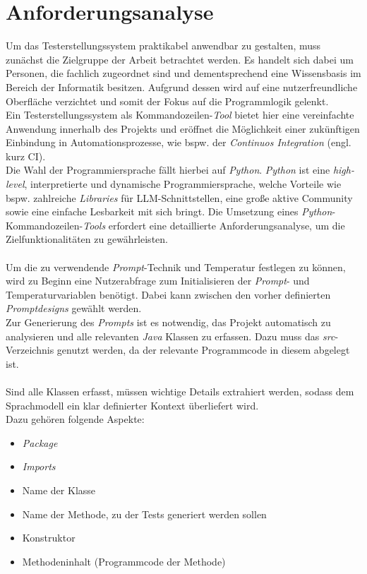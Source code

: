 \section{Anforderungsanalyse}\label{section:anford}
Um das Testerstellungssystem praktikabel anwendbar zu gestalten, muss zunächst die Zielgruppe der Arbeit betrachtet werden. Es handelt sich dabei um Personen, die fachlich zugeordnet sind und dementsprechend eine Wissensbasis im Bereich der Informatik besitzen. Aufgrund dessen wird auf eine nutzerfreundliche Oberfläche verzichtet und somit der Fokus auf die Programmlogik gelenkt.\\ Ein Testerstellungssystem als Kommandozeilen-\textit{Tool} bietet hier eine vereinfachte Anwendung innerhalb des Projekts und eröffnet die Möglichkeit einer zukünftigen Einbindung in Automationsprozesse, wie bspw. der \textit{Continuos Integration} (engl. kurz CI).\\ Die Wahl der Programmiersprache fällt hierbei auf \textit{Python}. \textit{Python} ist eine \textit{high-level}, interpretierte und dynamische Programmiersprache, welche Vorteile wie bspw. zahlreiche \textit{Libraries} für LLM-Schnittstellen, eine große aktive Community sowie eine einfache Lesbarkeit mit sich bringt. \cite*{PythonLanguageAdvantages2017} Die Umsetzung eines \textit{Python}-Kommandozeilen-\textit{Tools} erfordert eine detaillierte Anforderungsanalyse, um die Zielfunktionalitäten zu gewährleisten.\\\\
Um die zu verwendende \textit{Prompt}-Technik und Temperatur festlegen zu können, wird zu Beginn eine Nutzerabfrage zum Initialisieren der \textit{Prompt}- und Temperaturvariablen benötigt. Dabei kann zwischen den vorher definierten \textit{Promptdesigns} gewählt werden. \\ Zur Generierung des \textit{Prompts} ist es notwendig, das Projekt automatisch zu analysieren und alle relevanten \textit{Java} Klassen zu erfassen. Dazu muss das \textit{src}-Verzeichnis genutzt werden, da der relevante Programmcode in diesem abgelegt ist.\\\\ Sind alle Klassen erfasst, müssen wichtige Details extrahiert werden, sodass dem Sprachmodell ein klar definierter Kontext überliefert wird.\\ Dazu gehören folgende Aspekte:
\begin{itemize}
    \setlength{\parskip}{1pt}
    \item \textit{Package}
    \item \textit{Imports}
    \item Name der Klasse
    \item Name der Methode, zu der Tests generiert werden sollen
    \item Konstruktor
    \item Methodeninhalt (Programmcode der Methode)
\end{itemize}
